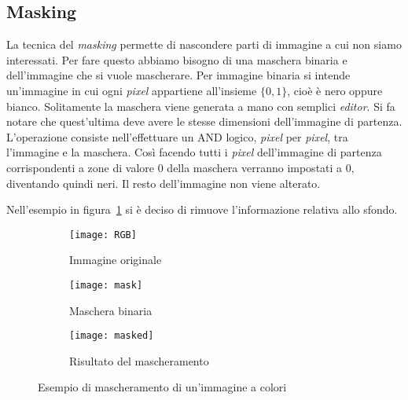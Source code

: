 \subsection {Masking}
La tecnica del \textit{masking} permette di nascondere parti di immagine a cui non siamo interessati.
Per fare questo abbiamo bisogno di una maschera binaria e dell'immagine che si vuole mascherare.
Per immagine binaria si intende un'immagine in cui ogni \textit{pixel} appartiene all'insieme $\{0,1\}$, cioè è nero oppure bianco.
Solitamente la maschera viene generata a mano con semplici \textit{editor}.
Si fa notare che quest'ultima deve avere le stesse dimensioni dell'immagine di partenza.
L'operazione consiste nell'effettuare un AND logico, \textit{pixel} per \textit{pixel},  tra l'immagine e la maschera.
Così facendo tutti i \textit{pixel} dell'immagine di partenza corrispondenti a zone di valore $0$ della maschera verranno impostati a $0$, diventando quindi neri.
Il resto dell'immagine non viene alterato.

Nell'esempio in figura~\ref{fig:mask_example} si è deciso di rimuove l'informazione relativa allo sfondo.

\begin{figure}[ht] %
  \begin{center}
  \begin{subfigure}{.49\linewidth}
    \centering\texttt{[image: RGB]}
    \caption{Immagine originale}
  \end{subfigure}
  \begin{subfigure}{.49\linewidth}
    \centering\texttt{[image: mask]}
    \caption{Maschera binaria}
  \end{subfigure}
  \begin{subfigure}{.49\linewidth}
    \centering\texttt{[image: masked]}
    \caption{Risultato del mascheramento}
  \end{subfigure}
  \end{center}
    \caption{Esempio di mascheramento di un'immagine a colori}
    \label{fig:mask_example}
\end{figure}


